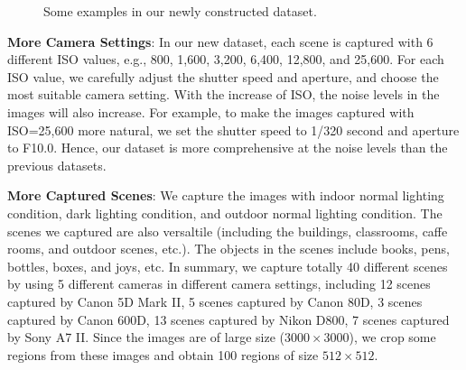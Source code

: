 \begin{figure}
{\begin{minipage}[t]{0.35\textwidth}
\end{minipage}
\begin{minipage}[t]{0.35\textwidth}
\centering
{}
\end{minipage}
}
\caption{Some examples in our newly constructed dataset.}
\label{fig6-3}
\end{figure}

\textbf{More Camera Settings}: In our new dataset, each scene is captured with 6 different ISO values, e.g., 800, 1,600, 3,200, 6,400, 12,800, and 25,600. For each ISO value, we carefully adjust the shutter speed and aperture, and choose the most suitable camera setting. With the increase of ISO, the noise levels in the images will also increase. For example, to make the images captured with ISO=25,600 more natural, we set the shutter speed to 1/320 second and aperture to F10.0. Hence, our dataset is more comprehensive at the noise levels than the previous datasets.

\textbf{More Captured Scenes}: We capture the images with indoor normal lighting condition, dark lighting condition, and outdoor normal lighting condition. The scenes we captured are also versaltile (including the buildings, classrooms, caffe rooms, and outdoor scenes, etc.). The objects in the scenes include books, pens, bottles, boxes, and joys, etc. In summary, we capture totally 40 different scenes by using 5 different cameras in different camera settings, including 12 scenes captured by Canon 5D Mark II, 5 scenes captured by Canon 80D, 3 scenes captured by Canon 600D, 13 scenes captured by Nikon D800, 7 scenes captured by Sony A7 II. Since the images are of large size ($3000\times3000$), we crop some regions from these images and obtain 100 regions of size $512\times512$.

